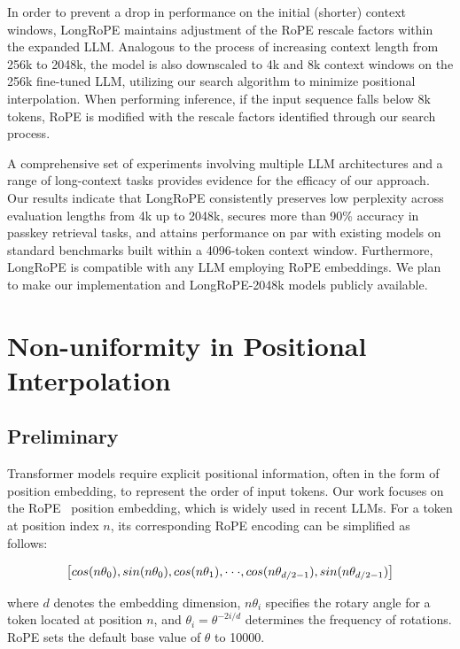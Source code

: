 In order to prevent a drop in performance on the initial (shorter) context windows, {LongRoPE} maintains adjustment of the RoPE rescale factors within the expanded LLM. Analogous to the process of increasing context length from 256k to 2048k, the model is also downscaled to 4k and 8k context windows on the 256k fine-tuned LLM, utilizing our search algorithm to minimize positional interpolation. When performing inference, if the input sequence falls below 8k tokens, RoPE is modified with the rescale factors identified through our search process.

A comprehensive set of experiments involving multiple LLM architectures and a range of long-context tasks provides evidence for the efficacy of our approach. Our results indicate that LongRoPE consistently preserves low perplexity across evaluation lengths from 4k up to 2048k, secures more than 90\% accuracy in passkey retrieval tasks, and attains performance on par with existing models on standard benchmarks built within a 4096-token context window. Furthermore, LongRoPE is compatible with any LLM employing RoPE embeddings. We plan to make our implementation and LongRoPE-2048k models publicly available.

\section{Non-uniformity in Positional Interpolation}
\label{sec:analysis}

\subsection{Preliminary}

Transformer models require explicit positional information, often in the form of position embedding, to represent the order of input tokens. Our work focuses on the RoPE~\cite{rope} position embedding, which is widely used in recent  LLMs. For a token at position index $n$, its corresponding RoPE encoding can be simplified as follows:

\begin{equation}
		\fontsize{7.8}{7.8} \selectfont
	\label{eq:rope}
	\left[ cos(n\theta_0), sin(n\theta_0), cos(n\theta_1), \cdot\cdot\cdot, cos(n\theta_{d/2-1}), sin(n\theta_{d/2-1}) \right]   
\end{equation}

where $d$ denotes the embedding dimension, 
$n\theta_i$ specifies the rotary angle for a token located at position $n$, and 
$\theta_i=\theta^{-2i/d}$ determines the frequency of rotations. RoPE sets the default base value of $\theta$ to 10000.

